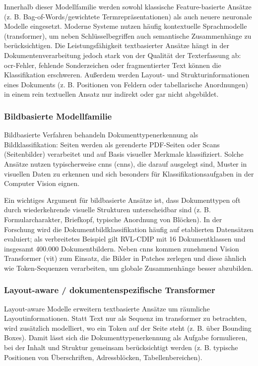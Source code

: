 Innerhalb dieser Modellfamilie werden sowohl klassische Feature-basierte Ansätze (z. B. Bag-of-Words/gewichtete Termrepräsentationen) als auch neuere neuronale Modelle eingesetzt. 
Moderne Systeme nutzen häufig kontextuelle Sprachmodelle (\gls{transformer}), um neben Schlüsselbegriffen auch semantische Zusammenhänge zu berücksichtigen. 
Die Leistungsfähigkeit textbasierter Ansätze hängt in der Dokumentenverarbeitung jedoch stark von der Qualität der Texterfassung ab: \acrshort{ocr}-Fehler, fehlende Sonderzeichen oder fragmentierter Text können die Klassifikation erschweren. 
Außerdem werden Layout- und Strukturinformationen eines Dokuments (z. B. Positionen von Feldern oder tabellarische Anordnungen) in einem rein textuellen Ansatz nur indirekt oder gar nicht abgebildet. \cite{elastic_textclassification}

\subsubsection{Bildbasierte Modellfamilie}

Bildbasierte Verfahren behandeln Dokumenttypenerkennung als Bildklassifikation: Seiten werden als gerenderte PDF-Seiten oder Scans (Seitenbilder) verarbeitet und auf Basis visueller Merkmale klassifiziert. 
Solche Ansätze nutzen typischerweise \acrlong{cnn}s (\acrshort{cnn}s), die darauf ausgelegt sind, Muster in visuellen Daten zu erkennen und sich besonders für Klassifikationsaufgaben in der Computer Vision eignen. \cite{googlecloud_cnn}

Ein wichtiges Argument für bildbasierte Ansätze ist, dass Dokumenttypen oft durch wiederkehrende visuelle Strukturen unterscheidbar sind (z. B. Formularcharakter, Briefkopf, typische Anordnung von Blöcken). 
In der Forschung wird die Dokumentbildklassifikation häufig auf etablierten Datensätzen evaluiert; als verbreitetes Beispiel gilt RVL-CDIP mit 16 Dokumentklassen und insgesamt 400.000 Dokumentbildern.
Neben \acrshort{cnn}s kommen zunehmend Vision Transformer (\acrshort{vit}) zum Einsatz, die Bilder in Patches zerlegen und diese ähnlich wie Token-Sequenzen verarbeiten, um globale Zusammenhänge besser abzubilden. \cite{harley_rvlcdip} \cite{v7labs_vitguide}

\subsubsection{Layout-aware / dokumentenspezifische Transformer}

Layout-aware Modelle erweitern textbasierte Ansätze um räumliche Layoutinformationen. Statt Text nur als Sequenz im \gls{transformer} zu betrachten, wird zusätzlich modelliert, wo ein Token auf der Seite steht (z. B. über Bounding Boxes). 
Damit lässt sich die Dokumenttypenerkennung als Aufgabe formulieren, bei der Inhalt und Struktur gemeinsam berücksichtigt werden (z. B. typische Positionen von Überschriften, Adressblöcken, Tabellenbereichen). \cite{huggingface_layoutlm}

